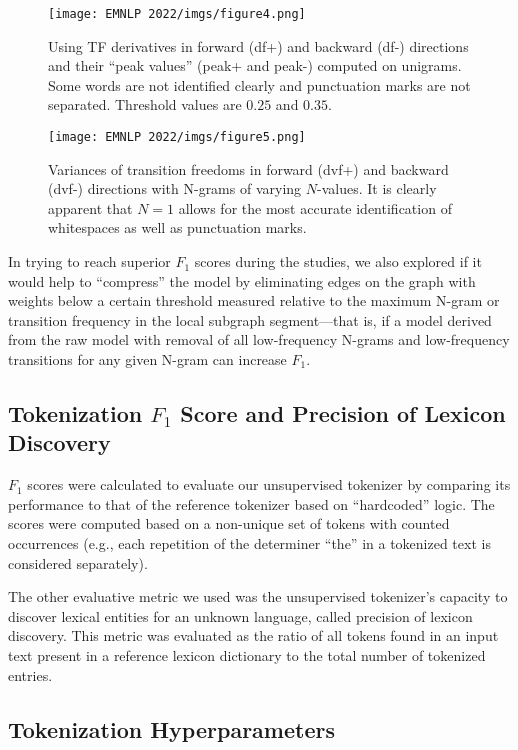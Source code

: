 \documentclass[11pt]{article}
\begin{document}
\begin{figure}[!ht]
  \texttt{[image: EMNLP 2022/imgs/figure4.png]}
  \caption{Using TF derivatives in forward (df+) and backward (df-) directions and their “peak values” (peak+ and peak-) computed on unigrams. Some words are not identified clearly and punctuation marks are not separated. Threshold values are $0.25$ and $0.35$.}
\end{figure}

\begin{figure}[!ht]
  \texttt{[image: EMNLP 2022/imgs/figure5.png]}
  \caption{Variances of transition freedoms in forward (dvf+) and backward (dvf-) directions with N-grams of varying $N$-values. It is clearly apparent that $N=1$ allows for the most accurate identification of whitespaces as well as punctuation marks.}
\end{figure}

In trying to reach superior $F_1$ scores during the studies, we also explored if it would help to “compress” the model by eliminating edges on the graph with weights below a certain threshold measured relative to the maximum N-gram or transition frequency in the local subgraph segment—that is, if a model derived from the raw model with removal of all low-frequency N-grams and low-frequency transitions for any given N-gram can increase $F_1$.

\subsection{Tokenization $F_1$ Score and Precision of Lexicon Discovery}

$F_1$ scores were calculated to evaluate our unsupervised tokenizer by comparing its performance to that of the reference tokenizer based on “hardcoded” logic. The scores were computed based on a non-unique set of tokens with counted occurrences (e.g., each repetition of the determiner “the” in a tokenized text is considered separately).

The other evaluative metric we used was the unsupervised tokenizer’s capacity to discover lexical entities for an unknown language, called precision of lexicon discovery. This metric was evaluated as the ratio of all tokens found in an input text present in a reference lexicon dictionary to the total number of tokenized entries.

\subsection{\label{35}Tokenization Hyperparameters}
\end{document}
